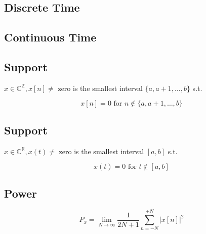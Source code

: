 \documentclass{article}
\begin{document}
\begin{paracol}{2} %
\switchcolumn[0] %
\begin{center}
    \section*{Discrete Time}
\end{center}

\switchcolumn[1] %
\begin{center}
    \section*{Continuous Time}
\end{center}

\switchcolumn[0]
\subsection{Support}
\begin{definition}
    $x \in \mathbb{C}^{\mathbb{Z}}, x[n] \neq$ zero is the smallest interval $\{a, a + 1, \dots, b\}$ s.t.

    \begin{equation*}
        x[n] = 0 \text{ for } n \notin \{a, a + 1, \dots, b\}
    \end{equation*}
\end{definition}

\switchcolumn[1]
\subsection{Support}
\begin{definition}
    $x \in \mathbb{C}^{\mathbb{R}}, x(t) \neq$ zero is the smallest interval $[a, b]$ s.t.

    \begin{equation*}
        x(t) = 0 \text{ for } t \notin [a, b]
    \end{equation*}
\end{definition}

\switchcolumn[0] %
\subsection{Power}
\begin{definition}
    \begin{equation*}
        P_x = \lim_{N \to \infty} \frac{1}{2N + 1} \sum_{n=-N}^{+N} |x[n]|^2
    \end{equation*}
\end{definition}


\end{paracol}
\end{document}
